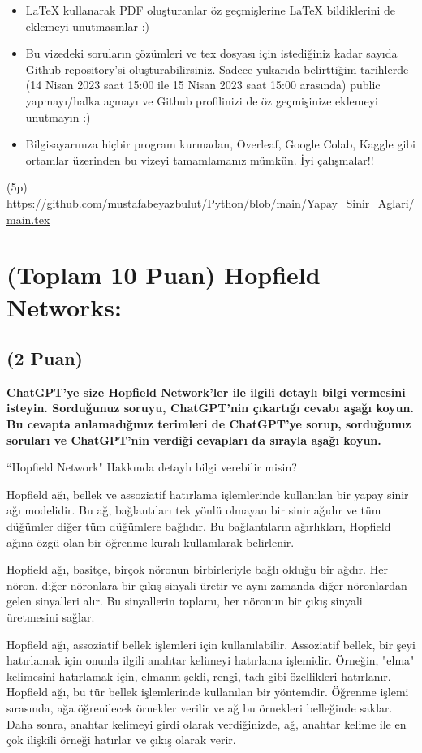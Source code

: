 \documentclass[11pt]{article}
\begin{document}
\begin{itemize}
    \item LaTeX kullanarak PDF oluşturanlar öz geçmişlerine LaTeX bildiklerini de eklemeyi unutmasınlar :)
    \item Bu vizedeki soruların çözümleri ve tex dosyası için istediğiniz kadar sayıda Github repository'si oluşturabilirsiniz. Sadece yukarıda belirttiğim tarihlerde (14 Nisan 2023 saat 15:00 ile 15 Nisan 2023 saat 15:00 arasında) public yapmayı/halka açmayı ve Github profilinizi de öz geçmişinize eklemeyi unutmayın :)
    \item Bilgisayarınıza hiçbir program kurmadan, Overleaf, Google Colab, Kaggle gibi ortamlar üzerinden bu vizeyi tamamlamanız mümkün. İyi çalışmalar!!
\end{itemize}
(5p) \url{https://github.com/mustafabeyazbulut/Python/blob/main/Yapay_Sinir_Aglari/main.tex}

\newpage
\section{(Toplam 10 Puan) Hopfield Networks:}

\subsection{(2 Puan)} \textbf{ChatGPT’ye size Hopfield Network’ler ile ilgili detaylı bilgi vermesini isteyin. Sorduğunuz soruyu, ChatGPT'nin çıkartığı cevabı aşağı koyun. Bu cevapta anlamadığınız terimleri de ChatGPT’ye sorup, sorduğunuz soruları ve ChatGPT’nin verdiği cevapları da sırayla aşağı koyun.}

“Hopfield Network" Hakkında detaylı bilgi verebilir misin?

Hopfield ağı, bellek ve assoziatif hatırlama işlemlerinde kullanılan bir yapay sinir ağı modelidir. Bu ağ, bağlantıları tek yönlü olmayan bir sinir ağıdır ve tüm düğümler diğer tüm düğümlere bağlıdır. Bu bağlantıların ağırlıkları, Hopfield ağına özgü olan bir öğrenme kuralı kullanılarak belirlenir.

Hopfield ağı, basitçe, birçok nöronun birbirleriyle bağlı olduğu bir ağdır. Her nöron, diğer nöronlara bir çıkış sinyali üretir ve aynı zamanda diğer nöronlardan gelen sinyalleri alır. Bu sinyallerin toplamı, her nöronun bir çıkış sinyali üretmesini sağlar.

Hopfield ağı, assoziatif bellek işlemleri için kullanılabilir. Assoziatif bellek, bir şeyi hatırlamak için onunla ilgili anahtar kelimeyi hatırlama işlemidir. Örneğin, "elma" kelimesini hatırlamak için, elmanın şekli, rengi, tadı gibi özellikleri hatırlanır. Hopfield ağı, bu tür bellek işlemlerinde kullanılan bir yöntemdir. Öğrenme işlemi sırasında, ağa öğrenilecek örnekler verilir ve ağ bu örnekleri belleğinde saklar. Daha sonra, anahtar kelimeyi girdi olarak verdiğinizde, ağ, anahtar kelime ile en çok ilişkili örneği hatırlar ve çıkış olarak verir.
\end{document}
